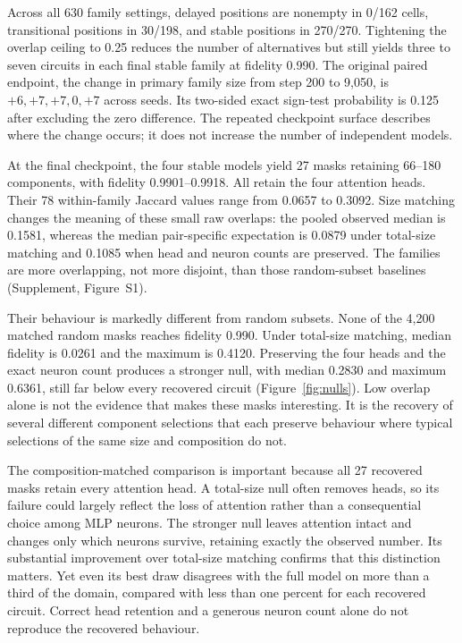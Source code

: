 Across all 630 family settings, delayed positions are nonempty in 0/162 cells, transitional positions in 30/198, and stable positions in 270/270. Tightening the overlap ceiling to 0.25 reduces the number of alternatives but still yields three to seven circuits in each final stable family at fidelity 0.990. The original paired endpoint, the change in primary family size from step 200 to 9,050, is $+6,+7,+7,0,+7$ across seeds. Its two-sided exact sign-test probability is 0.125 after excluding the zero difference. The repeated checkpoint surface describes where the change occurs; it does not increase the number of independent models.

At the final checkpoint, the four stable models yield 27 masks retaining 66--180 components, with fidelity 0.9901--0.9918. All retain the four attention heads. Their 78 within-family Jaccard values range from 0.0657 to 0.3092. Size matching changes the meaning of these small raw overlaps: the pooled observed median is 0.1581, whereas the median pair-specific expectation is 0.0879 under total-size matching and 0.1085 when head and neuron counts are preserved. The families are more overlapping, not more disjoint, than those random-subset baselines (Supplement, Figure~S1).

Their behaviour is markedly different from random subsets. None of the 4,200 matched random masks reaches fidelity 0.990. Under total-size matching, median fidelity is 0.0261 and the maximum is 0.4120. Preserving the four heads and the exact neuron count produces a stronger null, with median 0.2830 and maximum 0.6361, still far below every recovered circuit (Figure~\ref{fig:nulls}). Low overlap alone is not the evidence that makes these masks interesting. It is the recovery of several different component selections that each preserve behaviour where typical selections of the same size and composition do not.

The composition-matched comparison is important because all 27 recovered masks retain every attention head. A total-size null often removes heads, so its failure could largely reflect the loss of attention rather than a consequential choice among MLP neurons. The stronger null leaves attention intact and changes only which neurons survive, retaining exactly the observed number. Its substantial improvement over total-size matching confirms that this distinction matters. Yet even its best draw disagrees with the full model on more than a third of the domain, compared with less than one percent for each recovered circuit. Correct head retention and a generous neuron count alone do not reproduce the recovered behaviour.

